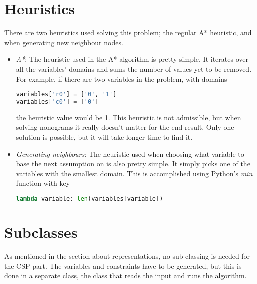 \documentclass{article}
\begin{document}
\section*{Heuristics}
There are two heuristics used solving this problem; the regular A* heuristic, and when generating new neighbour nodes.
\begin{itemize}
	\item \textit{A*}: The heuristic used in the A* algorithm is pretty simple. It iterates over all the variables' domains and sums the number of values yet to be removed. For example, if there are two variables in the problem, with  domains
\begin{lstlisting}[language=Python]
variables['r0'] = ['0', '1']
variables['c0'] = ['0']
\end{lstlisting}	
    the heuristic value would be 1. This heuristic is not admissible, but when solving nonograms it really doesn't matter for the end result. Only one solution is possible, but it will take longer time to find it.
	\item \textit{Generating neighbours}: The heuristic used when choosing what variable to base the next assumption on is also pretty simple. It simply picks one of the variables with the smallest domain. This is accomplished using Python's \textit{min} function with key
\begin{lstlisting}[language=Python]
lambda variable: len(variables[variable])	
\end{lstlisting}	
\end{itemize}

\section*{Subclasses}
As mentioned in the section about representations, no sub classing is needed for the CSP part. The variables and constraints have to be generated, but this is done in a separate class, the class that reads the input and runs the algorithm.
\end{document}
